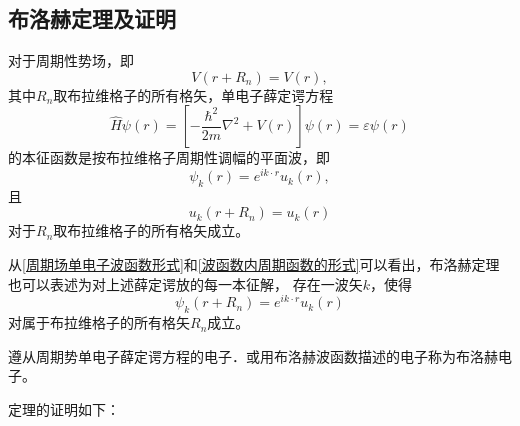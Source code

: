         \subsection{布洛赫定理及证明}\label{subsection:布洛赫定理及证明}
            \begin{define}
                对于周期性势场，即
                \begin{equation}
                    V(r+R_n)=V(r),
                \end{equation}
                其中$R_n$取布拉维格子的所有格矢，单电子薛定谔方程
                \begin{equation}
                    \hat{H}\psi(r)=\left[-\frac{\hbar^2}{2m}\nabla^2+V(r)\right]\psi(r)=\varepsilon\psi(r)
                \end{equation}
                的本征函数是按布拉维格子周期性调幅的平面波，即
                \begin{equation}
                    \psi_k(r)=e^{ik\cdot r}u_k(r)\label{周期场单电子波函数形式},
                \end{equation}
                且
                \begin{equation}
                    u_k(r+R_n)=u_k(r)\label{波函数内周期函数的形式}
                \end{equation}
                对于$R_n$取布拉维格子的所有格矢成立。
            \end{define}
            从\autoref{周期场单电子波函数形式}和\autoref{波函数内周期函数的形式}可以看出，布洛赫定理也可以表述为对上述薛定谔放的每一本征解，
            存在一波矢$k$，使得
            \begin{equation}
                \psi_k(r+R_n)=e^{ik\cdot r}u_k(r)\label{布洛赫定理}
            \end{equation}
            对属于布拉维格子的所有格矢$R_n$成立。

            遵从周期势单电子薛定谔方程的电子．或用布洛赫波函数描述的电子称为布洛赫电子。

            定理的证明如下：

